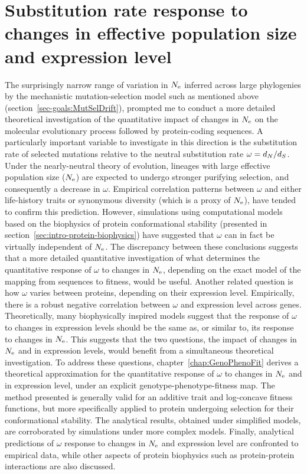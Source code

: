 \section{Substitution rate response to changes in effective population size and expression level}
\label{sec-goals:GenoPhenoFit}

The surprisingly narrow range of variation in $N_{\textrm{e}}$ inferred across large phylogenies by the mechanistic mutation-selection model such as mentioned above (section~\ref{sec-goals:MutSelDrift}), prompted me to conduct a more detailed theoretical investigation of the quantitative impact of changes in $N_{\textrm{e}}$ on the molecular evolutionary process followed by protein-coding sequences.
A particularly important variable to investigate in this direction is the substitution rate of selected mutations relative to the neutral substitution rate $\omega = d_N / d_S$.
Under the nearly-neutral theory of evolution, lineages with large effective population size ($N_{\textrm{e}}$) are expected to undergo stronger purifying selection, and consequently a decrease in $\omega$.
Empirical correlation patterns between $\omega$ and either life-history traits or synonymous diversity (which is a proxy of $N_{\textrm{e}}$), have tended to confirm this prediction.
However, simulations using computational models based on the biophysics of protein conformational stability (presented in section~\ref{sec:intro-protein-biophysics}) have suggested that $\omega$ can in fact be virtually independent of $N_{\textrm{e}}$.
The discrepancy between these conclusions suggests that a more detailed quantitative investigation of what determines the quantitative response of $\omega$ to changes in $N_{\textrm{e}}$, depending on the exact model of the mapping from sequences to fitness, would be useful.
Another related question is how $\omega$ varies between proteins, depending on their expression level.
Empirically, there is a robust negative correlation between $\omega$ and expression level across genes.
Theoretically, many biophysically inspired models suggest that the response of $\omega$ to changes in expression levels should be the same as, or similar to, its response to changes in $N_{\textrm{e}}$.
This suggests that the two questions, the impact of changes in $N_{\textrm{e}}$ and in expression levels, would benefit from a simultaneous theoretical investigation.
To address these questions, chapter~\ref{chap:GenoPhenoFit} derives a theoretical approximation for the quantitative response of $\omega$ to changes in $N_{\textrm{e}}$ and in expression level, under an explicit genotype-phenotype-fitness map.
The method presented is generally valid for an additive trait and log-concave fitness functions, but more specifically applied to protein undergoing selection for their conformational stability.
The analytical results, obtained under simplified models, are corroborated by simulations under more complex models.
Finally, analytical predictions of $\omega$ response to changes in $N_{\textrm{e}}$ and expression level are confronted to empirical data, while other aspects of protein biophysics such as protein-protein interactions are also discussed.

